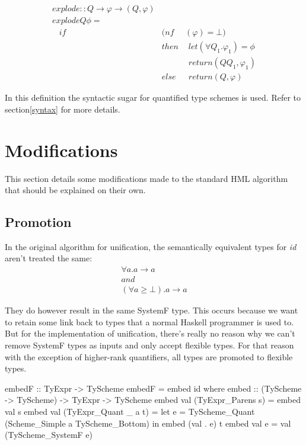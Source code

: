 \begin{eqnarray*}
explode :: Q \rightarrow \varphi \rightarrow (Q, \varphi) \\
explode Q \phi = \\
\hspace{10pt} if &(nf&(\varphi) = \bot) \\
                 &then& \hspace{5pt} let (\forall Q_1 . \varphi_1) = \phi \\
                 &\hspace{5pt}& \hspace{5pt} return (Q Q_1, \varphi_1) \\
                 &else& \hspace{5pt} return (Q, \varphi)
\end{eqnarray*}

In this definition the syntactic sugar for quantified type schemes is used. Refer to section\ref{syntax} for more details.
\section{Modifications}
This section details some modifications made to the standard HML algorithm that should be explained on their own.
\subsection{Promotion}
In the original algorithm for unification, the semantically equivalent types for \emph{id} aren't treated the same:
\begin{eqnarray*}
\forall a. a \rightarrow a \\
and \\
(\forall a \geq \bot). a \rightarrow a
\end{eqnarray*}

They do however result in the same SystemF type. This occurs because we want to retain some link back to types that a normal Haskell programmer is used to. But for the implementation of unification, there's really no reason why we can't remove SystemF types as inputs and only accept flexible types. For that reason with the exception of higher-rank quantifiers, all types are promoted to flexible types.

\begin{code}
embedF :: TyExpr -> TyScheme
embedF = embed id
 where embed :: (TyScheme -> TyScheme) -> TyExpr -> TyScheme
       embed val (TyExpr_Parens     s) = embed val s
       embed val (TyExpr_Quant  _ a t) = let e = TyScheme_Quant (Scheme_Simple a TyScheme_Bottom)
                                         in  embed (val . e) t
       embed val e                     = val (TyScheme_SystemF e)
\end{code}

